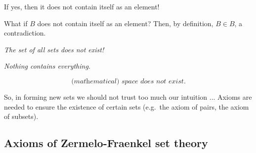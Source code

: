 \documentclass[11pt,paper=b5,footinclude,headinclude]{scrbook} %
\theoremstyle{remark}
\theoremstyle{definition} %
\begin{document}
If yes, then it does not contain itself as an element!

What if $ B $ does not contain itself as an element? Then, by definition, $ B \in B $, a contradiction.

{\em The set of all sets does not exist!}

{\centerline \em Nothing contains everything.}

$$ \textit{(mathematical) space does not exist.}$$

So, in forming new sets we should not trust too much our intuition ...
Axioms are needed to ensure the existence of certain sets (e.g.~the axiom of pairs, the axiom of subsets).

\subsection{Axioms of Zermelo-Fraenkel set theory}
\end{document}
